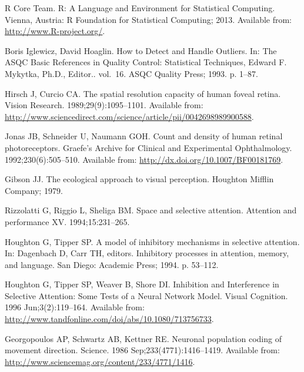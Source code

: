 \documentclass[10pt,letterpaper]{article}
\begin{document}
\begin{thebibliography}{10}
{R Core Team}.
\newblock R: {A} {Language} and {Environment} for {Statistical} {Computing}.
\newblock Vienna, Austria: R Foundation for Statistical Computing; 2013.
\newblock Available from: \url{http://www.R-project.org/}.

{Boris Iglewicz}, {David Hoaglin}.
\newblock How to {Detect} and {Handle} {Outliers}.
\newblock In: The {ASQC} {Basic} {References} in {Quality} {Control}:
  {Statistical} {Techniques}, {Edward} {F}. {Mykytka}, {Ph}.{D}., {Editor}..
  vol.~16. ASQC Quality Press; 1993. p. 1--87.

Hirsch J, Curcio CA.
\newblock The spatial resolution capacity of human foveal retina.
\newblock Vision Research. 1989;29(9):1095--1101.
\newblock Available from:
  \url{http://www.sciencedirect.com/science/article/pii/0042698989900588}.

Jonas JB, Schneider U, Naumann GOH.
\newblock Count and density of human retinal photoreceptors.
\newblock Graefe's Archive for Clinical and Experimental Ophthalmology.
  1992;230(6):505--510.
\newblock Available from: \url{http://dx.doi.org/10.1007/BF00181769}.

Gibson JJ.
\newblock The ecological approach to visual perception.
\newblock Houghton Mifflin Company; 1979.

Rizzolatti G, Riggio L, Sheliga BM.
\newblock Space and selective attention.
\newblock Attention and performance XV. 1994;15:231--265.

Houghton G, Tipper SP.
\newblock A model of inhibitory mechanisms in selective attention.
\newblock In: Dagenbach D, Carr TH, editors. Inhibitory processes in attention,
  memory, and language. San Diego: Academic Press; 1994. p. 53--112.

Houghton G, Tipper SP, Weaver B, Shore DI.
\newblock Inhibition and {Interference} in {Selective} {Attention}: {Some}
  {Tests} of a {Neural} {Network} {Model}.
\newblock Visual Cognition. 1996 Jun;3(2):119--164.
\newblock Available from:
  \url{http://www.tandfonline.com/doi/abs/10.1080/713756733}.

Georgopoulos AP, Schwartz AB, Kettner RE.
\newblock Neuronal population coding of movement direction.
\newblock Science. 1986 Sep;233(4771):1416--1419.
\newblock Available from:
  \url{http://www.sciencemag.org/content/233/4771/1416}.


\end{thebibliography}
\end{document}
